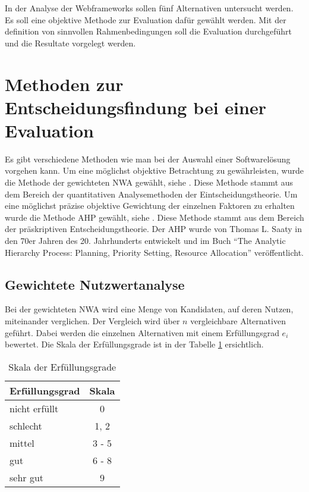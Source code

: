   In der Analyse der Webframeworks sollen fünf Alternativen untersucht werden.
  Es soll eine objektive Methode zur Evaluation dafür gewählt werden. Mit der
  definition von sinnvollen Rahmenbedingungen soll die Evaluation durchgeführt
  und die Resultate vorgelegt werden.
  
  \section{Methoden zur Entscheidungsfindung bei einer Evaluation}
  
  Es gibt verschiedene Methoden wie man bei der Auswahl einer Softwarelösung
  vorgehen kann. Um eine möglichst objektive Betrachtung zu gewährleisten, wurde
  die Methode der gewichteten \ac{NWA} gewählt, siehe \cite{Nutzwertanalyse}.
  Diese Methode stammt aus dem Bereich der quantitativen Analysemethoden der
  Eintscheidungstheorie. Um eine möglichst präzise objektive Gewichtung der
  einzelnen Faktoren zu erhalten wurde die Methode \ac{AHP} gewählt, siehe
  \cite{AnalyticHierarchyProcess}. Diese Methode stammt aus dem Bereich der
  präskriptiven Entscheidungstheorie. Der \ac{AHP} wurde von Thomas L. Saaty in
  den 70er Jahren des 20. Jahrhunderts entwickelt und im Buch ``The Analytic
  Hierarchy Process: Planning, Priority Setting, Resource
  Allocation''\cite{AnalyticHierarchyProcessBook} veröffentlicht.
  
  \subsection{Gewichtete Nutzwertanalyse}
  
  Bei der gewichteten \ac{NWA} wird eine Menge von Kandidaten, auf deren
  Nutzen, miteinander verglichen. Der Vergleich wird über \(n\) vergleichbare
  Alternativen geführt. Dabei werden die einzelnen Alternativen mit einem
  Erfüllungsgrad \(e_i\) bewertet. Die Skala der Erfüllungsgrade ist in der
  Tabelle \ref{tab:erfuellungsgrade} ersichtlich.
  \newline
  
  \begin{table}[h]
    \begin{center}
      \begin{tabular}{lc}
        \toprule
        Erfüllungsgrad & Skala\\
        \midrule
        nicht erfüllt & 0\\
        schlecht & 1, 2\\
        mittel & 3 - 5\\
        gut & 6 - 8\\
        sehr gut & 9\\
        \bottomrule
      \end{tabular}
      \caption{Skala der Erfüllungsgrade}
      \label{tab:erfuellungsgrade}
    \end{center}
  \end{table}
  
